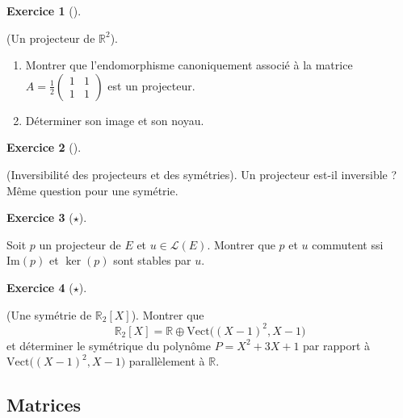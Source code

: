 \documentclass[
  french,
  letterpaper,
  DIV=11,
  numbers=noendperiod]{scrreprt}
\theoremstyle{plain}
\theoremstyle{definition}
\theoremstyle{plain}
\theoremstyle{plain}
\theoremstyle{definition}
\newtheorem{exercise}{Exercice}[chapter]
\theoremstyle{definition}
\theoremstyle{plain}
\theoremstyle{remark}
\begin{document}
\begin{exercise}[]\protect\hypertarget{exr-03-proj}{}\label{exr-03-proj}

(Un projecteur de \(\mathbb{R}^{2}\)).

\begin{enumerate}
\def\labelenumi{\arabic{enumi}.}
\item
  Montrer que l'endomorphisme canoniquement associé à la matrice
  \(\displaystyle A = \frac{1}{2}\begin{pmatrix}
  1&1\\
  1&1
  \end{pmatrix}\) est un projecteur.
\item
  Déterminer son image et son noyau.
\end{enumerate}

\end{exercise}

\begin{exercise}[]\protect\hypertarget{exr-03-0003}{}\label{exr-03-0003}

(Inversibilité des projecteurs et des symétries). Un projecteur est-il
inversible ? Même question pour une symétrie.

\end{exercise}

\begin{exercise}[\(\star\)]\protect\hypertarget{exr-03-0001}{}\label{exr-03-0001}

Soit \(p\) un projecteur de \(E\) et \(u\in\mathcal{L}(E)\). Montrer que
\(p\) et \(u\) commutent ssi \(\mathrm{Im}(p)\) et \(\ker(p)\) sont
stables par \(u\).

\end{exercise}

\begin{exercise}[\(\star\)]\protect\hypertarget{exr-03-sym-pol}{}\label{exr-03-sym-pol}

(Une symétrie de \(\mathbb{R}_{2}[X]\)). Montrer que
\[\mathbb{R}_2[X] = \mathbb{R}\oplus\mathrm{Vect}\big((X-1)^2,X-1\big)\]
et déterminer le symétrique du polynôme \(P=X^2 + 3X + 1\) par rapport à
\(\mathrm{Vect}\big((X-1)^2,X-1\big)\) parallèlement à \(\mathbb{R}\).

\end{exercise}

\subsection{Matrices}\label{matrices}
\end{document}
